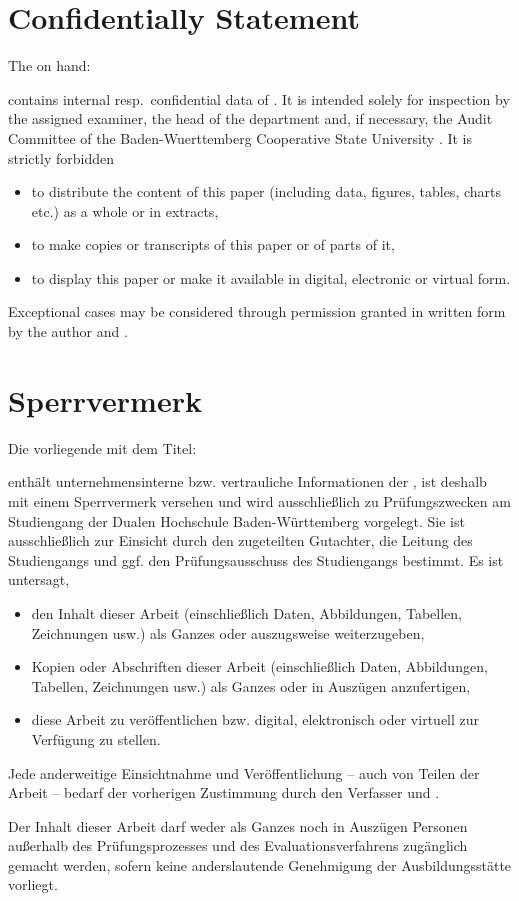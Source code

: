 

{
	\chapter*{Confidentially Statement}
	The {\arbeit} on hand:
	\begin{quote}
		\textit{\titel}
	\end{quote}
 	contains internal resp.\ confidential data of {\firmaName}. It is intended solely for inspection by the assigned examiner, the head of the {\studiengang} department and, if necessary, the Audit Committee of the Baden-Wuerttemberg Cooperative State University \abgabeOrt. It is strictly forbidden
  	\begin{itemize}
		\item to distribute the content of this paper (including data, figures, tables, charts etc.) as a whole or in extracts,
		\item to make copies or transcripts of this paper or of parts of it,
		\item to display this paper or make it available in digital, electronic or virtual form.
  	\end{itemize}
	Exceptional cases may be considered through permission granted in written form by the author and {\firmaName}.
}
{
	\chapter*{Sperrvermerk}
	{
		Die vorliegende {\arbeit} mit dem Titel: 
		\begin{quote}
			\textit{\titel}
		\end{quote}
		enthält unternehmensinterne bzw. vertrauliche Informationen der {\firmaName}, ist deshalb mit einem Sperrvermerk versehen und wird ausschließlich zu Prüfungszwecken am Studiengang {\studiengang} der Dualen Hochschule Baden-Württemberg {\abgabeOrt} vorgelegt. Sie ist ausschließlich zur Einsicht durch den zugeteilten Gutachter, die Leitung des Studiengangs und ggf. den Prüfungsausschuss des Studiengangs bestimmt.  Es ist untersagt,
		\begin{itemize}
			\item den Inhalt dieser Arbeit (einschließlich Daten, Abbildungen, Tabellen, Zeichnungen usw.) als Ganzes oder auszugsweise weiterzugeben,
			\item Kopien oder Abschriften dieser Arbeit (einschließlich Daten, Abbildungen, Tabellen, Zeichnungen usw.) als Ganzes oder in Auszügen anzufertigen,
			\item diese Arbeit zu veröffentlichen bzw. digital, elektronisch oder virtuell zur Verfügung zu stellen. 
		\end{itemize}
		Jede anderweitige Einsichtnahme und Veröffentlichung – auch von Teilen der Arbeit – bedarf der vorherigen Zustimmung durch den Verfasser und {\firmaName}.
	}
	{
		Der Inhalt dieser Arbeit darf weder als Ganzes noch in Auszügen Personen außerhalb des Prüfungsprozesses und des Evaluationsverfahrens zugänglich gemacht werden, sofern keine anderslautende Genehmigung der Ausbildungsstätte vorliegt.
	}
}